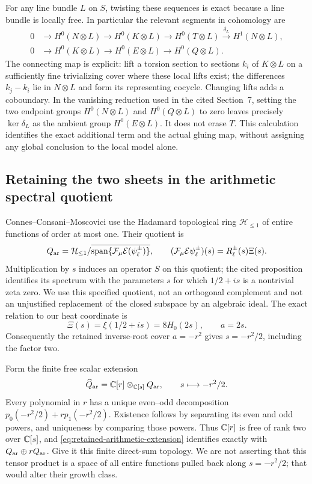 For any line bundle $L$ on $S$, twisting these sequences is exact
because a line bundle is locally free. In particular the relevant
segments in cohomology are
\begin{align*}
0&\longrightarrow H^0(N\otimes L)\longrightarrow H^0(K\otimes L)
 \longrightarrow H^0(T\otimes L)
 \xrightarrow{\delta_L} H^1(N\otimes L),\\
0&\longrightarrow H^0(K\otimes L)\longrightarrow H^0(E\otimes L)
 \longrightarrow H^0(Q\otimes L).
\end{align*}
The connecting map is explicit: lift a torsion section to sections
$k_i$ of $K\otimes L$ on a sufficiently fine trivializing cover
where these local lifts exist; the differences $k_j-k_i$ lie in
$N\otimes L$ and form its representing cocycle.
Changing lifts adds a coboundary. In the vanishing reduction used in
the cited Section~7, setting the two endpoint groups
$H^0(N\otimes L)$ and $H^0(Q\otimes L)$ to zero leaves precisely
$\ker\delta_L$ as the ambient group $H^0(E\otimes L)$.
It does not erase $T$. This calculation identifies the exact additional
term and the actual gluing map, without assigning any global conclusion
to the local model alone.

\subsection{Retaining the two sheets in the arithmetic spectral quotient}
Connes--Consani--Moscovici\cite[Section~3.6, Proposition~3.6]{ccmProlate2024}
use the Hadamard topological ring $\mathcal H_{\le1}$ of entire
functions of order at most one. Their quotient is
\[
 Q_{\rm ar}=\mathcal H_{\le1}/
 \overline{\operatorname{span}\{\mathcal F_\mu\mathcal E(\psi_\ell^\pm)\}},
 \qquad
 (\mathcal F_\mu\mathcal E\psi_\ell^\pm)(s)=R_\ell^\pm(s)\Xi(s).
\]
Multiplication by $s$ induces an operator $S$ on this quotient;
the cited proposition identifies its spectrum with the parameters
$s$ for which $1/2+is$ is a nontrivial zeta zero. We use this
specified quotient, not an orthogonal complement and not an
unjustified replacement of the closed subspace by an algebraic ideal.
The exact relation to our heat coordinate is
\[
 \Xi(s)=\xi(1/2+is)=8H_0(2s),\qquad a=2s.
\]
Consequently the retained inverse-root cover $a=-r^2$ gives
$s=-r^2/2$, including the factor two.

Form the finite free scalar extension
\begin{equation}
 \widehat Q_{\rm ar}=\mathbb C[r]\otimes_{\mathbb C[s]}Q_{\rm ar},
 \qquad s\longmapsto-r^2/2.
 \label{eq:retained-arithmetic-extension}
\end{equation}
Every polynomial in $r$ has a unique even--odd decomposition
$p_0(-r^2/2)+r p_1(-r^2/2)$. Existence follows by separating its
even and odd powers, and uniqueness by comparing those powers.
Thus $\mathbb C[r]$ is free of rank two over $\mathbb C[s]$, and
\eqref{eq:retained-arithmetic-extension} identifies exactly with
$Q_{\rm ar}\oplus rQ_{\rm ar}$. Give it this finite direct-sum
topology. We are not asserting that this tensor product is a space
of all entire functions pulled back along $s=-r^2/2$; that would
alter their growth class.

